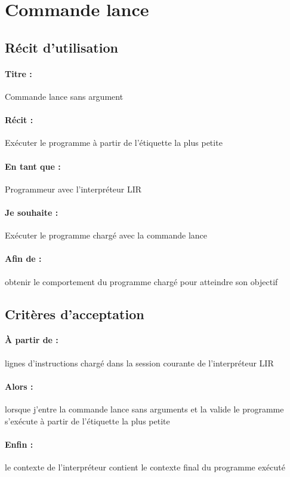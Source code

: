 \section{Commande lance}
    \subsection*{Récit d'utilisation}

    \paragraph{Titre : } Commande lance sans argument
    \paragraph{Récit : } Exécuter le programme à partir de l'étiquette la plus petite
    \paragraph{En tant que : } Programmeur avec l'interpréteur LIR
    \paragraph{Je souhaite : } Exécuter le programme chargé avec la commande lance
    \paragraph{Afin de : } obtenir le comportement du programme chargé pour atteindre son objectif

    \subsection*{Critères d'acceptation}

    \paragraph{À partir de : } lignes d'instructions chargé dans la session courante de l'interpréteur LIR
    \paragraph{Alors : } lorsque j'entre la commande lance sans arguments et la valide le programme s'exécute à
                         partir de l'étiquette la plus petite
    \paragraph{Enfin : } le contexte de l'interpréteur contient le contexte final du programme exécuté
